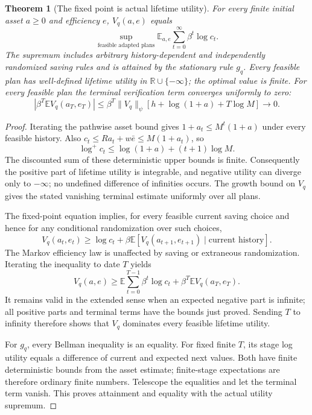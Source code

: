 \documentclass[11pt]{article}
\newtheorem{theorem}{Theorem}
\theoremstyle{definition}
\begin{document}
\begin{theorem}[The fixed point is actual lifetime utility]
For every finite initial asset $a\geq0$ and efficiency $e$, $V_q(a,e)$
equals
\[
 \sup_{\text{feasible adapted plans}}
 \mathbb E_{a,e}\sum_{t=0}^{\infty}\beta^t\log c_t.
\]
The supremum includes arbitrary history-dependent and independently
randomized saving rules and is attained by the stationary rule $g_q$.
Every feasible plan has well-defined lifetime utility in
$\mathbb R\cup\{-\infty\}$; the optimal value is finite. For every
feasible plan the terminal verification term converges uniformly to zero:
\[
 \left|\beta^T\mathbb E V_q(a_T,e_T)\right|
 \leq\beta^T\|V_q\|_\psi
       [h+\log(1+a)+T\log M]\longrightarrow0.
\]
\end{theorem}
\begin{proof}
Iterating the pathwise asset bound gives
$1+a_t\leq M^t(1+a)$ under every feasible history. Also
$c_t\leq Ra_t+w\bar e\leq M(1+a_t)$, so
\[
 \log^+c_t\leq\log(1+a)+(t+1)\log M.
\]
The discounted sum of these deterministic upper bounds is finite.
Consequently the positive part of lifetime utility is integrable, and
negative utility can diverge only to $-\infty$; no undefined difference
of infinities occurs. The growth bound on $V_q$ gives the stated
vanishing terminal estimate uniformly over all plans.

The fixed-point equation implies, for every feasible current saving
choice and hence for any conditional randomization over such choices,
\[
 V_q(a_t,e_t)\geq\log c_t+
       \beta\mathbb E[V_q(a_{t+1},e_{t+1})\mid\text{current history}].
\]
The Markov efficiency law is unaffected by saving or extraneous
randomization. Iterating the inequality to date $T$ yields
\[
 V_q(a,e)\geq\mathbb E\sum_{t=0}^{T-1}\beta^t\log c_t
                 +\beta^T\mathbb E V_q(a_T,e_T).
\]
It remains valid in the extended sense when an expected negative part
is infinite; all positive parts and terminal terms have the bounds just
proved. Sending $T$ to infinity therefore shows that $V_q$ dominates
every feasible lifetime utility.

For $g_q$, every Bellman inequality is an equality. For fixed finite
$T$, its stage log utility equals a difference of current and expected
next values. Both have finite deterministic bounds from the asset
estimate; finite-stage expectations are therefore ordinary finite
numbers. Telescope the equalities and let the terminal term vanish.
This proves attainment and equality with the actual utility supremum.
\end{proof}
\end{document}
